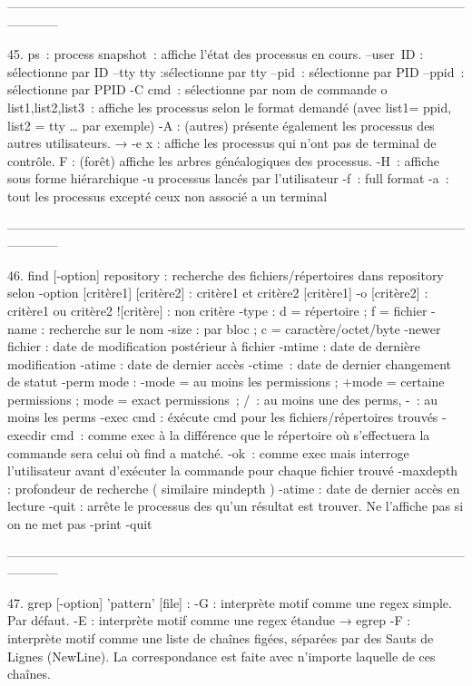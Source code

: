 \documentclass[a4paper, 10pt, onecolumn, openright, oneside]{book}
\begin{document}
------------------------------------------------------------------------------------------------------------------------

    45. ps : process snapshot : affiche l'état des processus en cours.
--user ID : sélectionne par ID
--tty tty :sélectionne par tty
--pid : sélectionne par PID
--ppid : sélectionne par PPID
-C cmd : sélectionne par nom de commande
o list1,list2,list3 : affiche les processus selon le format demandé (avec list1= ppid, list2 = tty … par exemple)
-A : (autres) présente également les processus des  autres utilisateurs. → -e
x : affiche  les  processus  qui n'ont pas de terminal de contrôle.
F : (forêt)  affiche les arbres généalogiques des processus.
-H : affiche sous forme hiérarchique 
-u processus lancés par l’utilisateur
-f : full format
-a : tout les processus excepté ceux non associé a un terminal

------------------------------------------------------------------------------------------------------------------------

    46. find [-option] repository : recherche des fichiers/répertoires dans repository selon -option
[critère1]  [critère2] : critère1 et critère2
[critère1] -o [critère2] : critère1 ou critère2
![critère] : non critère
-type : d = répertoire ; f = fichier
-name : recherche sur le nom
-size : par bloc ; c = caractère/octet/byte
-newer fichier : date de modification postérieur à fichier
-mtime : date de dernière modification
-atime : date de dernier accès
-ctime : date de dernier changement de statut
-perm mode : -mode = au moins les permissions ; +mode = certaine permissions ; 
	mode = exact permissions ; 	/ : au moins une des perms, 	- : au moins les perms
-exec cmd : éxécute cmd pour les fichiers/répertoires trouvés
-execdir cmd : comme exec à la différence que le répertoire où s’effectuera la commande sera celui où find a matché. 
-ok : comme exec mais interroge l'utilisateur avant d’exécuter la commande pour chaque fichier trouvé
-maxdepth : profondeur de recherche ( similaire mindepth )
-atime : date de dernier accès en lecture
-quit : arrête le processus des qu'un résultat est trouver. Ne l'affiche pas si on ne met pas -print -quit 

------------------------------------------------------------------------------------------------------------------------

    47. grep [-option] 'pattern' [file] :
-G : interprète motif comme une regex simple. Par défaut.
-E : interprète motif comme une regex étandue → egrep
-F : interprète motif comme une liste de chaînes figées, séparées par des Sauts de Lignes (NewLine). La correspondance est faite avec n'importe laquelle de ces chaînes.
\end{document}
